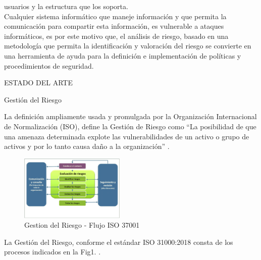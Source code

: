 \documentclass[a4paper,12pt]{article}
\begin{document}
usuarios y la estructura que los soporta.\\
Cualquier sistema informático que maneje información y que permita la comunicación 
para compartir esta información, es vulnerable a ataques informáticos, es por 
este motivo que, el análisis de riesgo, basado en una metodología que permita la identificación y valoración del riesgo se convierte en una herramienta 
de ayuda para la definición e implementación de políticas y procedimientos de 
seguridad.\\
\begin{bf}
\begin{center}
ESTADO DEL ARTE\\
\end{center}
\end{bf}
\begin{bf}   
Gestión del Riesgo\\
\end{bf}
\break
La definición ampliamente usada y promulgada por la Organización Internacional de 
Normalización (ISO), define la Gestión de Riesgo como “La posibilidad de que una 
amenaza determinada explote las vulnerabilidades de un activo o grupo de activos y 
por lo tanto causa daño a la organización” \cite{Institute2009}.
\begin{figure}[h!]
\centering
\includegraphics[width=5cm]{Manejo_Riesgo_ISO-31000.png}
\caption{Gestion del Riesgo - Flujo ISO 37001}
\end{figure}
La Gestión del Riesgo, conforme el estándar ISO 31000:2018 consta de los procesos indicados en la 
Fig1. \cite{Grupo2018}.
\end{document}
